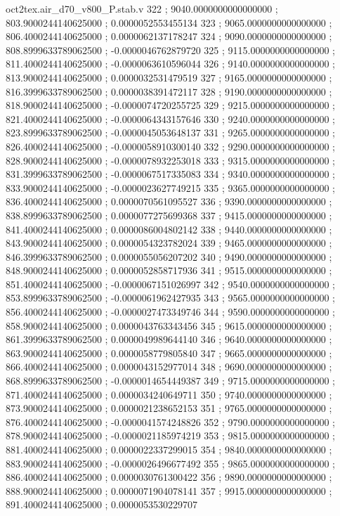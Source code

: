 \begin{filecontents}[overwrite]{oct2tex.air_d70_v800_P.stab.v}
322 ; 9040.0000000000000000 ; 803.9000244140625000 ; 0.0000052553455134
323 ; 9065.0000000000000000 ; 806.4000244140625000 ; 0.0000062137178247
324 ; 9090.0000000000000000 ; 808.8999633789062500 ; -0.0000046762879720
325 ; 9115.0000000000000000 ; 811.4000244140625000 ; -0.0000063610596044
326 ; 9140.0000000000000000 ; 813.9000244140625000 ; 0.0000032531479519
327 ; 9165.0000000000000000 ; 816.3999633789062500 ; 0.0000038391472117
328 ; 9190.0000000000000000 ; 818.9000244140625000 ; -0.0000074720255725
329 ; 9215.0000000000000000 ; 821.4000244140625000 ; -0.0000064343157646
330 ; 9240.0000000000000000 ; 823.8999633789062500 ; -0.0000045053648137
331 ; 9265.0000000000000000 ; 826.4000244140625000 ; -0.0000058910300140
332 ; 9290.0000000000000000 ; 828.9000244140625000 ; -0.0000078932253018
333 ; 9315.0000000000000000 ; 831.3999633789062500 ; -0.0000067517335083
334 ; 9340.0000000000000000 ; 833.9000244140625000 ; -0.0000023627749215
335 ; 9365.0000000000000000 ; 836.4000244140625000 ; 0.0000070561095527
336 ; 9390.0000000000000000 ; 838.8999633789062500 ; 0.0000077275699368
337 ; 9415.0000000000000000 ; 841.4000244140625000 ; 0.0000086004802142
338 ; 9440.0000000000000000 ; 843.9000244140625000 ; 0.0000054323782024
339 ; 9465.0000000000000000 ; 846.3999633789062500 ; 0.0000055056207202
340 ; 9490.0000000000000000 ; 848.9000244140625000 ; 0.0000052858717936
341 ; 9515.0000000000000000 ; 851.4000244140625000 ; -0.0000067151026997
342 ; 9540.0000000000000000 ; 853.8999633789062500 ; -0.0000061962427935
343 ; 9565.0000000000000000 ; 856.4000244140625000 ; -0.0000027473349746
344 ; 9590.0000000000000000 ; 858.9000244140625000 ; 0.0000043763343456
345 ; 9615.0000000000000000 ; 861.3999633789062500 ; 0.0000049989644140
346 ; 9640.0000000000000000 ; 863.9000244140625000 ; 0.0000058779805840
347 ; 9665.0000000000000000 ; 866.4000244140625000 ; 0.0000043152977014
348 ; 9690.0000000000000000 ; 868.8999633789062500 ; -0.0000014654449387
349 ; 9715.0000000000000000 ; 871.4000244140625000 ; 0.0000034240649711
350 ; 9740.0000000000000000 ; 873.9000244140625000 ; 0.0000021238652153
351 ; 9765.0000000000000000 ; 876.4000244140625000 ; -0.0000041574248826
352 ; 9790.0000000000000000 ; 878.9000244140625000 ; -0.0000021185974219
353 ; 9815.0000000000000000 ; 881.4000244140625000 ; 0.0000022337299015
354 ; 9840.0000000000000000 ; 883.9000244140625000 ; -0.0000026496677492
355 ; 9865.0000000000000000 ; 886.4000244140625000 ; 0.0000030761300422
356 ; 9890.0000000000000000 ; 888.9000244140625000 ; 0.0000071904078141
357 ; 9915.0000000000000000 ; 891.4000244140625000 ; 0.0000053530229707

\end{filecontents}
